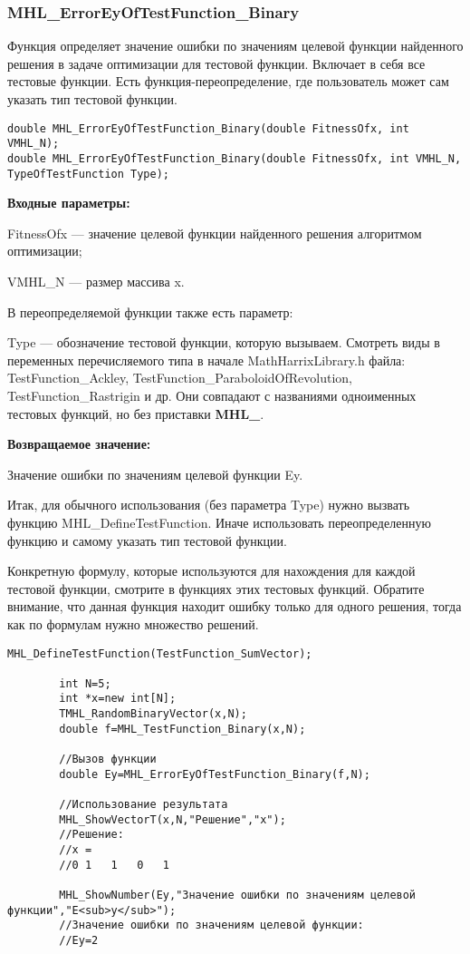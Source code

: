 \documentclass[a4paper,12pt]{article}
\begin{document}
\subsubsection{MHL\_ErrorEyOfTestFunction\_Binary}\label{MHL_ErrorEyOfTestFunction_Binary}

Функция определяет значение ошибки по значениям целевой функции найденного решения в задаче оптимизации для тестовой функции. Включает в себя все тестовые функции. Есть функция-переопределение, где пользователь может сам указать тип тестовой функции.


\begin{lstlisting}[label=code_syntax_MHL_ErrorEyOfTestFunction_Binary,caption=Синтаксис]
double MHL_ErrorEyOfTestFunction_Binary(double FitnessOfx, int VMHL_N);
double MHL_ErrorEyOfTestFunction_Binary(double FitnessOfx, int VMHL_N, TypeOfTestFunction Type);
\end{lstlisting}

\textbf{Входные параметры:}

FitnessOfx --- значение целевой функции найденного решения алгоритмом оптимизации;

VMHL\_N --- размер массива x.

В переопределяемой функции также есть параметр:
  
Type --- обозначение тестовой функции, которую вызываем.
Смотреть виды в переменных перечисляемого типа в начале MathHarrixLibrary.h файла: TestFunction\_Ackley, TestFunction\_ParaboloidOfRevolution, TestFunction\_Rastrigin и др. Они совпадают с названиями одноименных тестовых функций, но без приставки \textbf{MHL\_}.

\textbf{Возвращаемое значение:}
 
Значение ошибки по значениям целевой функции Ey.

Итак, для обычного использования (без параметра Type) нужно вызвать функцию MHL\_DefineTestFunction. Иначе использовать переопределенную функцию и самому указать тип тестовой функции.

Конкретную формулу, которые используются для нахождения для каждой тестовой функции, смотрите в функциях этих тестовых функций. Обратите внимание, что данная функция находит ошибку только для одного решения, тогда как по формулам нужно множество решений.


\begin{lstlisting}[label=code_use_MHL_ErrorEyOfTestFunction_Binary,caption=Пример использования]
        MHL_DefineTestFunction(TestFunction_SumVector);

        int N=5;
        int *x=new int[N];
        TMHL_RandomBinaryVector(x,N);
        double f=MHL_TestFunction_Binary(x,N);

        //Вызов функции
        double Ey=MHL_ErrorEyOfTestFunction_Binary(f,N);

        //Использование результата
        MHL_ShowVectorT(x,N,"Решение","x");
        //Решение:
        //x =	
        //0	1	1	0	1

        MHL_ShowNumber(Ey,"Значение ошибки по значениям целевой функции","E<sub>y</sub>");
        //Значение ошибки по значениям целевой функции:
        //Ey=2
\end{lstlisting}
\end{document}
